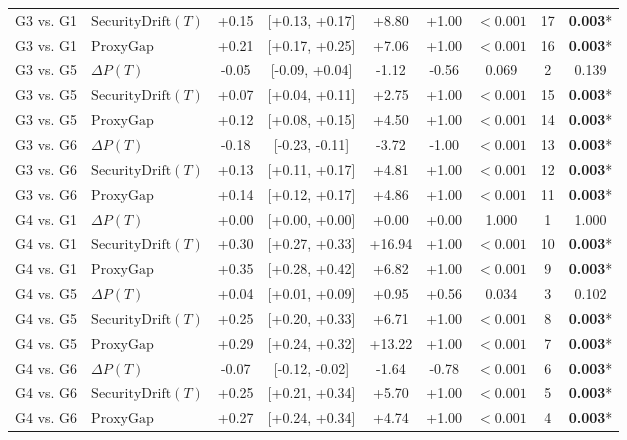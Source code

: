 \begin{table}[t]
\begin{tabular}{llccccccc}
G3 vs. G1 & $\text{SecurityDrift}(T)$ & +0.15 & [+0.13, +0.17] & +8.80 & +1.00 & $<0.001$ & 17 & \textbf{0.003}* \\
G3 vs. G1 & $\text{ProxyGap}$ & +0.21 & [+0.17, +0.25] & +7.06 & +1.00 & $<0.001$ & 16 & \textbf{0.003}* \\
G3 vs. G5 & $\Delta P(T)$ & -0.05 & [-0.09, +0.04] & -1.12 & -0.56 & 0.069 & 2 & 0.139 \\
G3 vs. G5 & $\text{SecurityDrift}(T)$ & +0.07 & [+0.04, +0.11] & +2.75 & +1.00 & $<0.001$ & 15 & \textbf{0.003}* \\
G3 vs. G5 & $\text{ProxyGap}$ & +0.12 & [+0.08, +0.15] & +4.50 & +1.00 & $<0.001$ & 14 & \textbf{0.003}* \\
G3 vs. G6 & $\Delta P(T)$ & -0.18 & [-0.23, -0.11] & -3.72 & -1.00 & $<0.001$ & 13 & \textbf{0.003}* \\
G3 vs. G6 & $\text{SecurityDrift}(T)$ & +0.13 & [+0.11, +0.17] & +4.81 & +1.00 & $<0.001$ & 12 & \textbf{0.003}* \\
G3 vs. G6 & $\text{ProxyGap}$ & +0.14 & [+0.12, +0.17] & +4.86 & +1.00 & $<0.001$ & 11 & \textbf{0.003}* \\
G4 vs. G1 & $\Delta P(T)$ & +0.00 & [+0.00, +0.00] & +0.00 & +0.00 & 1.000 & 1 & 1.000 \\
G4 vs. G1 & $\text{SecurityDrift}(T)$ & +0.30 & [+0.27, +0.33] & +16.94 & +1.00 & $<0.001$ & 10 & \textbf{0.003}* \\
G4 vs. G1 & $\text{ProxyGap}$ & +0.35 & [+0.28, +0.42] & +6.82 & +1.00 & $<0.001$ & 9 & \textbf{0.003}* \\
G4 vs. G5 & $\Delta P(T)$ & +0.04 & [+0.01, +0.09] & +0.95 & +0.56 & 0.034 & 3 & 0.102 \\
G4 vs. G5 & $\text{SecurityDrift}(T)$ & +0.25 & [+0.20, +0.33] & +6.71 & +1.00 & $<0.001$ & 8 & \textbf{0.003}* \\
G4 vs. G5 & $\text{ProxyGap}$ & +0.29 & [+0.24, +0.32] & +13.22 & +1.00 & $<0.001$ & 7 & \textbf{0.003}* \\
G4 vs. G6 & $\Delta P(T)$ & -0.07 & [-0.12, -0.02] & -1.64 & -0.78 & $<0.001$ & 6 & \textbf{0.003}* \\
G4 vs. G6 & $\text{SecurityDrift}(T)$ & +0.25 & [+0.21, +0.34] & +5.70 & +1.00 & $<0.001$ & 5 & \textbf{0.003}* \\
G4 vs. G6 & $\text{ProxyGap}$ & +0.27 & [+0.24, +0.34] & +4.74 & +1.00 & $<0.001$ & 4 & \textbf{0.003}* \\
\bottomrule
\end{tabular}
\end{table}
